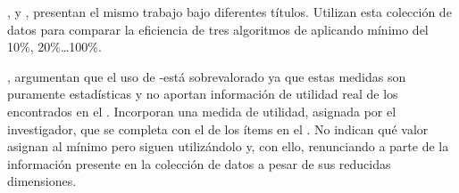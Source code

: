 \cite{MalikRaheja-ImprovingPerformanceOfFrequentItemsetAlgorithm-2013}, y \cite{RituArora-IntensificationOfExecutionOfFrequentItemSetAlgorithms-2014}, presentan el mismo trabajo bajo diferentes títulos. Utilizan esta colección de datos para comparar la eficiencia de tres algoritmos de \ARM aplicando \soporte mínimo del 10\%, 20\%\ldots 100\%.

\cite{SahooKumarGoswami-AnAlgorithmForMiningHighUtilityClosedItemsetsAndGenerators-2014}, argumentan que el uso de \soporte-\confianza está sobrevalorado ya que estas medidas son puramente estadísticas y no aportan información de utilidad real de los \itemsets encontrados en el \dataset. Incorporan una medida de utilidad, asignada por el investigador, que se completa con el \soporte de los ítems en el \dataset. No indican qué valor asignan al \soporte mínimo pero siguen utilizándolo y, con ello, renunciando a parte de la información presente en la colección de datos a pesar de sus reducidas dimensiones.

